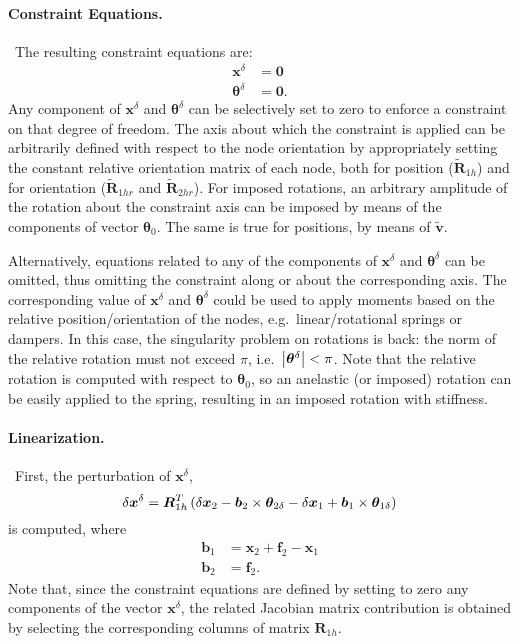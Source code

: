 \documentclass[10pt,dvips,fleqn,subeqn]{report}
\newcommand{\T}[1]{\bm{#1}}
\begin{document}
\paragraph{Constraint Equations.} \
The resulting constraint equations are:
\begin{subequations}
\begin{align}
	\T{x}^{\delta} &= \T{0}
	\label{TOTAL-JOINT:constraint-x} \\
	\T{\theta}^{\delta} &= \T{0} .
	\label{TOTAL-JOINT:constraint-theta}
\end{align}
\end{subequations}
Any component of $\T{x}^{\delta}$ and $\T{\theta}^{\delta}$
can be selectively set to zero to enforce a constraint
on that degree of freedom.
The axis about which the constraint is applied can be arbitrarily 
defined with respect to the node orientation
by appropriately setting the constant relative orientation
matrix of each node, both for position ($\tilde{\T{R}}_{1h}$) 
and for orientation ($\tilde{\T{R}}_{1hr}$ and $\tilde{\T{R}}_{2hr}$).
For imposed rotations, an arbitrary amplitude of the rotation about 
the constraint axis can be imposed by means of the components 
of vector $\T{\theta}_0$.
The same is true for positions, by means of $\tilde{\T{v}}$. 

Alternatively, equations related to any of the components
of $\T{x}^{\delta}$ and $\T{\theta}^{\delta}$ can be omitted,
thus omitting the constraint along or about the corresponding axis.
The corresponding value of  $\T{x}^{\delta}$ and $\T{\theta}^{\delta}$ 
could be used to apply moments based on the relative position/orientation 
of the nodes, e.g.\ linear/rotational springs or dampers.
In this case, the singularity problem on rotations is back: the norm
of the relative rotation must not exceed $\pi$, i.e.\
$\shbr{\T{\theta}^{\delta}}<\pi$.
Note that the relative rotation is computed with respect to 
$\T{\theta}_0$, so an anelastic (or imposed) rotation can be easily
applied to the spring, resulting in an imposed rotation with stiffness.

\paragraph{Linearization.} \
First, the perturbation of $\T{x}^{\delta}$,
\begin{equation}
	\delta \T{x}^{\delta} = 
	\T{R}_{1h}^T\plbr{
		\delta\T{x}_2 - \T{b}_2 \times \T{\theta}_{2\delta}
		- \delta\T{x}_1 + \T{b}_1 \times \T{\theta}_{1\delta}
	}
\end{equation}
is computed, where
\begin{subequations}
\begin{align}
	\T{b}_1 &= \T{x}_2 + \T{f}_2 - \T{x}_1 \\
	\T{b}_2 &= \T{f}_2 .
\end{align}
\end{subequations}
Note that, since the constraint equations are defined by setting 
to zero any components of the vector $\T{x}^{\delta}$, the
related Jacobian matrix contribution is obtained by selecting 
the corresponding columns of matrix $\T{R}_{1h}$.
\end{document}
